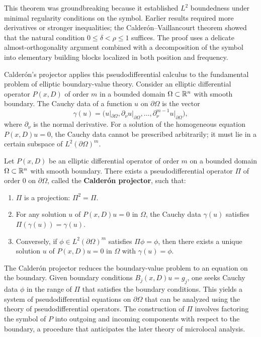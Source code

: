 This theorem was groundbreaking because it established $L^2$ boundedness under minimal regularity conditions on the symbol. Earlier results required more derivatives or stronger inequalities; the Calder\'{o}n--Vaillancourt theorem showed that the natural condition $0 \leq \delta < \rho \leq 1$ suffices. The proof uses a delicate almost-orthogonality argument combined with a decomposition of the symbol into elementary building blocks localized in both position and frequency.

Calder\'{o}n's projector applies this pseudodifferential calculus to the fundamental problem of elliptic boundary-value theory. Consider an elliptic differential operator $P(x,D)$ of order $m$ in a bounded domain $\Omega \subset \mathbb{R}^n$ with smooth boundary. The Cauchy data of a function $u$ on $\partial\Omega$ is the vector
\[
\gamma(u) = \bigl(u|_{\partial\Omega}, \partial_\nu u|_{\partial\Omega}, \ldots, \partial_\nu^{m-1} u|_{\partial\Omega}\bigr),
\]
where $\partial_\nu$ is the normal derivative. For a solution of the homogeneous equation $P(x,D)u = 0$, the Cauchy data cannot be prescribed arbitrarily; it must lie in a certain subspace of $L^2(\partial\Omega)^m$.

\begin{theorem}
Let $P(x,D)$ be an elliptic differential operator of order $m$ on a bounded domain $\Omega \subset \mathbb{R}^n$ with smooth boundary. There exists a pseudodifferential operator $\Pi$ of order $0$ on $\partial\Omega$, called the \textbf{Calder\'{o}n projector}, such that:
\begin{enumerate}
    \item $\Pi$ is a projection: $\Pi^2 = \Pi$.
    \item For any solution $u$ of $P(x,D)u = 0$ in $\Omega$, the Cauchy data $\gamma(u)$ satisfies $\Pi(\gamma(u)) = \gamma(u)$.
    \item Conversely, if $\phi \in L^2(\partial\Omega)^m$ satisfies $\Pi\phi = \phi$, then there exists a unique solution $u$ of $P(x,D)u = 0$ in $\Omega$ with $\gamma(u) = \phi$.
\end{enumerate}
\end{theorem}

The Calder\'{o}n projector reduces the boundary-value problem to an equation on the boundary. Given boundary conditions $B_j(x,D)u = g_j$, one seeks Cauchy data $\phi$ in the range of $\Pi$ that satisfies the boundary conditions. This yields a system of pseudodifferential equations on $\partial\Omega$ that can be analyzed using the theory of pseudodifferential operators. The construction of $\Pi$ involves factoring the symbol of $P$ into outgoing and incoming components with respect to the boundary, a procedure that anticipates the later theory of microlocal analysis.

